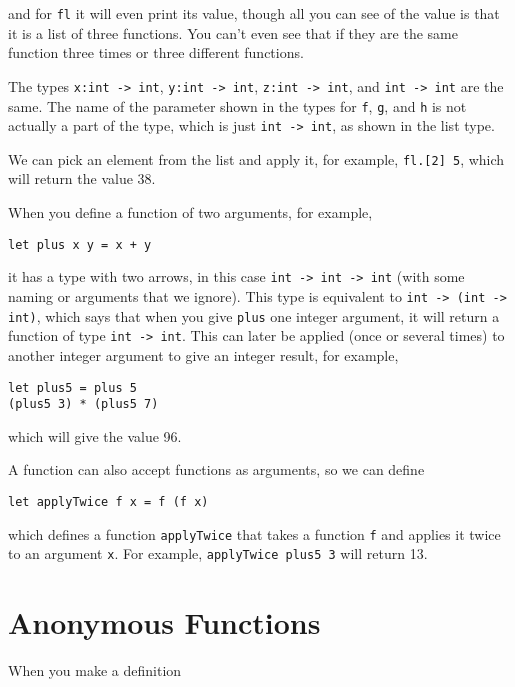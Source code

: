\documentclass[a4paper]{article}
\begin{document}
\noindent
and for \texttt{fl} it will even print its value, though all you can
see of the value is that it is a list of three functions.  You can't
even see that if they are the same function three times or three
different functions.

The types \texttt{x:int -> int}, \texttt{y:int -> int}, \texttt{z:int
  -> int}, and \texttt{int -> int} are the same.  The name of the
parameter shown in the types for \texttt{f}, \texttt{g}, and
\texttt{h} is not actually a part of the type, which is just
\texttt{int -> int}, as shown in the list type.

We can pick an element from the list and apply it, for example,
\texttt{fl.[2]~5}, which will return the value 38.

When you define a function of two arguments, for example,

\begin{verbatim}
let plus x y = x + y
\end{verbatim}

\noindent
it has a type with two arrows, in this case \texttt{int -> int -> int}
(with some naming or arguments that we ignore).  This type is
equivalent to \texttt{int -> (int -> int)}, which says that when you
give \texttt{plus} one integer argument, it will return a function of
type \texttt{int -> int}.  This can later be applied (once or several
times) to another integer argument to give an integer result, for
example,

\begin{verbatim}
let plus5 = plus 5
(plus5 3) * (plus5 7)
\end{verbatim}

\noindent
which will give the value 96.

A function can also accept functions as arguments, so we can define

\begin{verbatim}
let applyTwice f x = f (f x)
\end{verbatim}

\noindent
which defines a function \texttt{applyTwice} that takes a function
\texttt{f} and applies it twice to an argument \texttt{x}.  For
example, \texttt{applyTwice plus5 3} will return 13.

\section{Anonymous Functions}

When you make a definition
\end{document}
